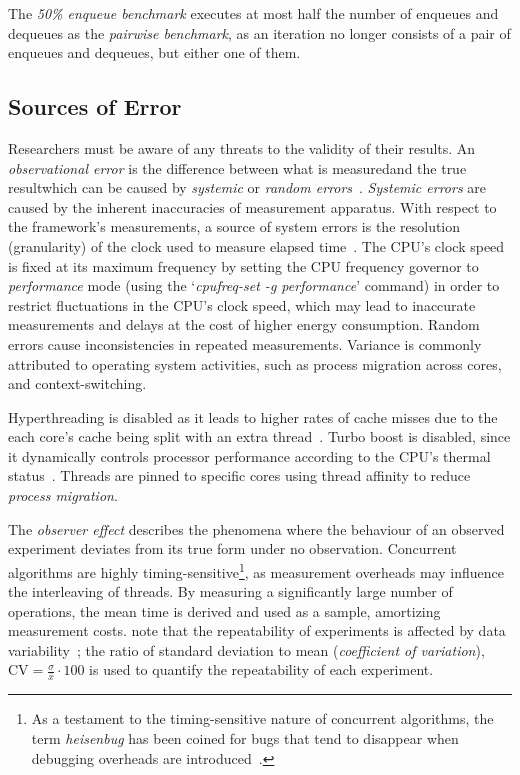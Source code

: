 The \emph{50\% enqueue benchmark} executes at most
half the number of enqueues and dequeues as the \emph{pairwise
benchmark}, as an iteration no longer consists of a pair of
enqueues and dequeues, but either one of them.

\subsection{Sources of Error}
Researchers must be aware of any threats to the validity of
their results. 
An \emph{observational error} is the difference between what is
measured\textemdash and the true result\textemdash which can be caused by
\emph{systemic} or \emph{random errors}~\citep{lelbach2015cppbenchmarking}.
\emph{Systemic errors} are caused by the inherent inaccuracies of measurement
apparatus. 
With respect to the framework's measurements, a source of system errors is the
resolution (granularity) of the clock used to measure elapsed
time~\citep{lelbach2015cppbenchmarking}. 
The CPU's clock speed is fixed at its maximum frequency by setting the CPU
frequency governor to \emph{performance} mode (using the `\emph{cpufreq-set -g
performance}' command) in order to restrict fluctuations in the CPU's clock
speed, which may lead to inaccurate measurements and delays at the cost of
higher energy consumption. Random errors cause inconsistencies in repeated
measurements.
Variance is commonly attributed to operating system activities, such as process
migration across cores, and context-switching.

Hyperthreading is disabled as it leads to higher rates of cache misses due to
the each core's cache being split with an extra
thread~\citep{fog2020optimizing}.
Turbo boost is disabled, since it dynamically controls processor performance
according to the CPU's thermal status~\citep[Section~14.3.3]{intel2021system}.
Threads are pinned to specific cores using thread affinity to reduce \emph{process
migration}.

The \emph{observer effect} describes the phenomena where the behaviour of an
observed experiment deviates
from its true form under no observation. Concurrent algorithms are
highly timing-sensitive\footnote{As a testament to the timing-sensitive nature
of concurrent algorithms, the term \emph{heisenbug} has been coined for bugs
that tend to disappear when debugging overheads are
introduced~\cite{perfbook2021}.}, as measurement overheads may influence the
interleaving of threads. By measuring a significantly large
number of operations, the mean time is derived and used as a sample, amortizing
measurement costs. \citeauthor{aceto2021benchmarking} note that
the repeatability of experiments is affected by data
variability~\citep{aceto2021benchmarking}; the ratio of standard deviation to
mean (\emph{coefficient of variation}), $\text{CV} = \frac{\sigma}{\bar{x}}
\cdot 100$ is used to quantify the repeatability of each experiment.

